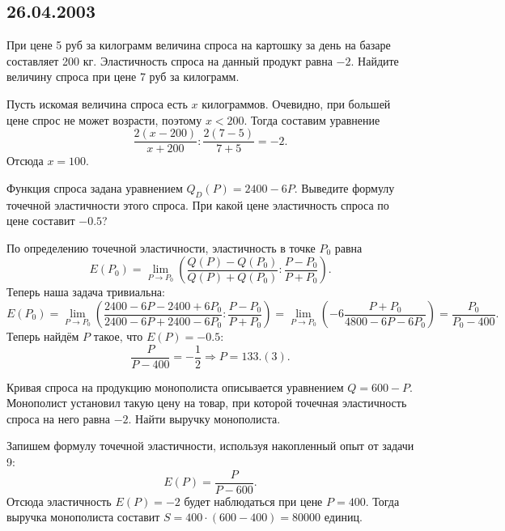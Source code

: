 \documentclass[a4paper]{article}
\begin{document}
\subsection*{26.04.2003}

\begin{problem}
При цене 5 руб за килограмм величина спроса на картошку за день на базаре составляет
200 кг. Эластичность спроса на данный продукт равна $-2$. Найдите величину спроса при цене 7 руб за
килограмм.
\end{problem}

\begin{solution}
Пусть искомая величина спроса есть $x$ килограммов. Очевидно, при большей цене
спрос не может возрасти, поэтому $x < 200$. Тогда составим уравнение
$$\frac{2(x-200)}{x+200}: \frac{2(7-5)}{7+5}=-2.$$
Отсюда $x=100$.
\end{solution}

\begin{problem}
Функция спроса задана уравнением $Q_D(P)=2400-6P$. Выведите формулу точечной
эластичности этого спроса. При какой цене эластичность спроса по цене составит $-0.5$?
\end{problem}

\begin{solution}
По определению точечной эластичности, эластичность в точке $P_0$ равна
$$E(P_0)=\lim_{P \rightarrow P_0} \left(\frac{Q(P)-Q(P_0)}{Q(P)+Q(P_0)}:\frac{P-P_0}{P+P_0}\right).$$
Теперь наша задача тривиальна:
$$E(P_0)=\lim_{P \rightarrow P_0} \left(\frac{2400-6P-2400+6P_0}{2400-6P+2400-6P_0}:\frac{P-P_0}{P+P_0} \right)=
\lim_{P \rightarrow P_0} \left(-6\frac{P+P_0}{4800-6P-6P_0}\right)=\frac{P_0}{P_0-400}.$$
Теперь найдём $P$ такое, что $E(P)=-0.5$:
$$\frac{P}{P-400}=-\frac{1}{2} \Rightarrow P = 133.(3).$$
\end{solution}

\begin{problem}
Кривая спроса на продукцию монополиста описывается уравнением $Q=600-P$.
Монополист установил такую цену на товар, при которой точечная эластичность спроса на
него равна $-2$. Найти выручку монополиста.
\end{problem}
\begin{solution}
Запишем формулу точечной эластичности, используя накопленный опыт от задачи 9:
$$E(P)=\frac{P}{P-600}.$$
Отсюда эластичность $E(P)=-2$ будет наблюдаться при цене $P=400$. Тогда выручка монополиста
составит $S=400 \cdot (600-400)= 80000$ единиц.
\end{solution}
\end{document}
